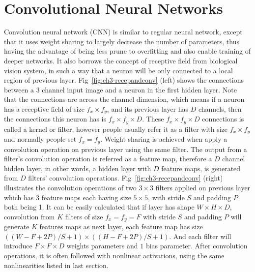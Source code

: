 \section{Convolutional Neural Networks}
Convolution neural network (CNN) is similar to regular neural network, except that it uses weight sharing to largely decrease the number of parameters, thus having the advantage of being less prune to overfitting and also enable training of deeper networks. It also borrows the concept of receptive field from biological vision system, in such a way that a neuron will be only connected to a local region of previous layer. Fig~\ref{fig:ch3-recepandconv} (left) shows the connections between a 3 channel input image and a neuron in the first hidden layer. Note that the connections are across the channel dimension, which means if a neuron has a receptive field of size $f_x\times f_y$, and its previous layer has $D$ channels, then the connections this neuron has is $f_x\times f_y \times D$. These $f_x\times f_y\times D$ connections is called a kernel or filter, however people usually refer it as a filter with size $f_x \times f_y$ and normally people set $f_x = f_y$. Weight sharing is achieved when apply a convolution operation on previous layer using the same filter. The output from a filter's convolution operation is referred as a feature map, therefore a $D$ channel hidden layer, in other words, a hidden layer with $D$ feature maps, is generated from $D$ filters' convolution operations. Fig~\ref{fig:ch3-recepandconv} (right) illustrates the convolution operations of two $3\times 3$ filters applied on previous layer which has 3 feature maps each having size $5\times 5$, with stride $S$ and padding $P$ both being 1. It can be easily calculated that if layer has shape $W\times H\times D$, convolution from $K$ filters of size $f_x=f_y=F$ with stride $S$ and padding $P$ will generate $K$ features maps as next layer, each feature map has size $((W-F+2P)/S+1) \times ((H-F+2P)/S+1)$. And each filter will introduce $F\times F\times D$ weights parameters and $1$ bias parameter. After convolution operations, it is often followed with nonlinear activations, using the same nonlinearities listed in last section.

